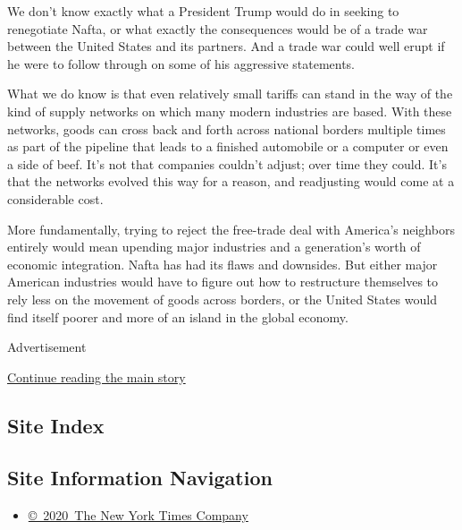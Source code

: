 We don't know exactly what a President Trump would do in seeking to
renegotiate Nafta, or what exactly the consequences would be of a trade
war between the United States and its partners. And a trade war could
well erupt if he were to follow through on some of his aggressive
statements.

What we do know is that even relatively small tariffs can stand in the
way of the kind of supply networks on which many modern industries are
based. With these networks, goods can cross back and forth across
national borders multiple times as part of the pipeline that leads to a
finished automobile or a computer or even a side of beef. It's not that
companies couldn't adjust; over time they could. It's that the networks
evolved this way for a reason, and readjusting would come at a
considerable cost.

More fundamentally, trying to reject the free-trade deal with America's
neighbors entirely would mean upending major industries and a
generation's worth of economic integration. Nafta has had its flaws and
downsides. But either major American industries would have to figure out
how to restructure themselves to rely less on the movement of goods
across borders, or the United States would find itself poorer and more
of an island in the global economy.

Advertisement

\protect\hyperlink{after-bottom}{Continue reading the main story}

\hypertarget{site-index}{%
\subsection{Site Index}\label{site-index}}

\hypertarget{site-information-navigation}{%
\subsection{Site Information
Navigation}\label{site-information-navigation}}

\begin{itemize}
\tightlist
\item
  \href{https://help.nytimes3xbfgragh.onion/hc/en-us/articles/115014792127-Copyright-notice}{©~2020~The
  New York Times Company}
\end{itemize}

